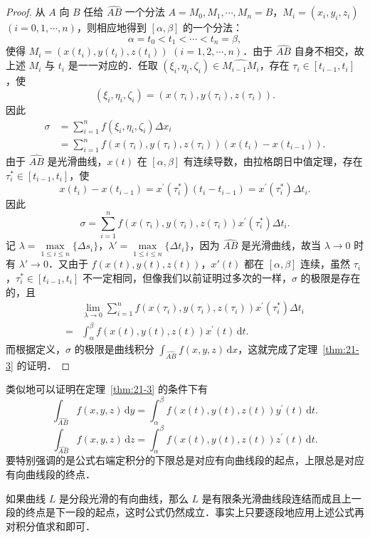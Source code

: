 \begin{proof}
从 $A$ 向 $B$ 任给 $\widehat{AB}$ 一个分法 $A=M_{0},M_{1},\cdots,M_{n}=B$，$M_{i}=(x_{i},y_{i},z_{i})$ $(i=0,1,\cdots,n)$，则相应地得到 $[\alpha,\beta]$ 的一个分法：
\[
\alpha=t_{0}<t_{1}<\cdots<t_{n}=\beta,
\]
使得 $M_{i}=(x(t_{i}),y(t_{i}),z(t_{i}))$ $(i=1,2,\cdots,n)$．由于 $\widehat{AB}$ 自身不相交，故上述 $M_{i}$ 与 $t_{i}$ 是一一对应的．任取 $(\xi_{i},\eta_{i},\zeta_{i})\in\widehat{M_{i-1}M_{i}}$，存在 $\tau_{i}\in[t_{i-1},t_{i}]$，使
\[
(\xi_{i},\eta_{i},\zeta_{i})=(x(\tau_{i}),y(\tau_{i}),z(\tau_{i})).
\]
因此
\[
\begin{aligned}
\sigma&=\sum_{i=1}^{n}f(\xi_{i},\eta_{i},\zeta_{i})\Delta x_{i}\\
&=\sum_{i=1}^{n}f(x(\tau_{i}),y(\tau_{i}),z(\tau_{i}))\left(x(t_{i})-x(t_{i-1})\right).
\end{aligned}
\]
由于 $\widehat{AB}$ 是光滑曲线，$x(t)$ 在 $[\alpha,\beta]$ 有连续导数，由拉格朗日中值定理，存在 $\tau_{i}^{*}\in[t_{i-1},t_{i}]$，使
\[
x(t_{i})-x(t_{i-1})=x^{\prime}(\tau_{i}^{*})(t_{i}-t_{i-1})=x^{\prime}(\tau_{i}^{*})\Delta t_{i}.
\]
因此
\[
\sigma=\sum_{i=1}^{n}f(x(\tau_{i}),y(\tau_{i}),z(\tau_{i}))x^{\prime}(\tau_{i}^{*})\Delta t_{i}.
\]
记 $\lambda=\max\limits_{1\leqslant i\leqslant n}\{\Delta s_{i}\}$，$\lambda'=\max\limits_{1\leqslant i\leqslant n}\{\Delta t_{i}\}$，因为 $\widehat{AB}$ 是光滑曲线，故当 $\lambda\to0$ 时有 $\lambda'\to0$．又由于 $f(x(t),y(t),z(t))$，$x'(t)$ 都在 $[\alpha,\beta]$ 连续，虽然 $\tau_{i}$，$\tau_{i}^{*}\in[t_{i-1},t_{i}]$ 不一定相同，但像我们以前证明过多次的一样，$\sigma$ 的极限是存在的，且
\[
\begin{aligned}
&\lim_{\lambda\to0}\sum_{i=1}^{n}f(x(\tau_{i}),y(\tau_{i}),z(\tau_{i}))x^{\prime}(\tau_{i}^{*})\Delta t_{i}\\
={}&\int_{\alpha}^{\beta}f(x(t),y(t),z(t))x^{\prime}(t)\,\mathrm{d}t.
\end{aligned}
\]
而根据定义，$\sigma$ 的极限是曲线积分 $\displaystyle\int_{\widehat{AB}}f(x,y,z)\,\mathrm{d}x$，这就完成了定理~\ref{thm:21-3} 的证明．
\end{proof}

类似地可以证明在定理~\ref{thm:21-3} 的条件下有
\[
\int_{\widehat{AB}}f(x,y,z)\,\mathrm{d}y=\int_{\alpha}^{\beta}f(x(t),y(t),z(t))y^{\prime}(t)\,\mathrm{d}t.
\]
\[
\int_{\widehat{AB}}f(x,y,z)\,\mathrm{d}z=\int_{\alpha}^{\beta}f(x(t),y(t),z(t))z^{\prime}(t)\,\mathrm{d}t.
\]
要特别强调的是公式右端定积分的下限总是对应有向曲线段的起点，上限总是对应有向曲线段的终点．

如果曲线 $L$ 是分段光滑的有向曲线，那么 $L$ 是有限条光滑曲线段连结而成且上一段的终点是下一段的起点，这时公式仍然成立．事实上只要逐段地应用上述公式再对积分值求和即可．

